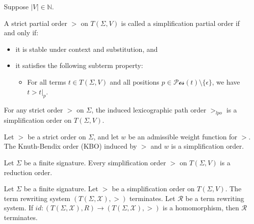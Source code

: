 Suppose $|V| \mathop{\in} \mathbb{N}$.
    
\begin{definition}
A strict partial order $>$ on $T(\Sigma,V)$ is called a simplification partial order if and only if:
\begin{itemize}
    \item it is stable under context and substitution, and
    \item it satisfies the following subterm property:
    \begin{itemize}
        \item For all terms $t \mathop{\in} T(\Sigma,V)$ and all positions $p \mathop{\in} \mathcal{Pos}(t) \mathop{\setminus} \{\epsilon\}$, we have $t \mathop{>} t|_p$.
    \end{itemize}
\end{itemize}  
\end{definition}

\begin{proposition}
For any strict order $>$ on $\Sigma$, the induced lexicographic path order $>_{lpo}$ is a simplification order on $T(\Sigma,V)$.
\end{proposition}
    
\begin{proposition}
Let $>$ be a strict order on $\Sigma$, and let $w$ be an admissible weight function for $>$. The Knuth-Bendix order (KBO) induced by $>$ and $w$ is a simplification order.
\end{proposition}
    
\begin{theorem}
Let $\Sigma$ be a finite signature. Every simplification order $>$ on $T(\Sigma,V)$ is a reduction order.
\end{theorem}

\begin{corollary}
  Let $\Sigma$ be a finite signature. Let $>$ be a simplification order on $T(\Sigma,V)$. The term rewriting system $(T(\Sigma,\mathcal{X}),>)$ terminates. Let $\mathcal{R}$ be a term rewriting system. If $id : (T(\Sigma,\mathcal{X}),R) \mathop{\to}  (T(\Sigma,\mathcal{X}),>)$ is a homomorphism, then $\mathcal{R}$ terminates.
\end{corollary}